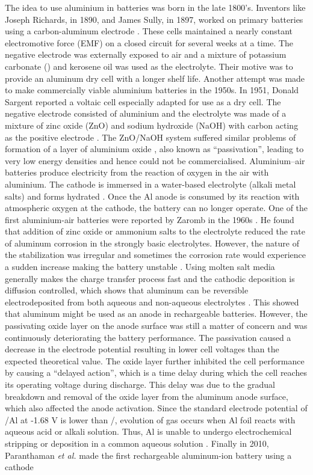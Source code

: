 The idea to use aluminium in batteries was born in the late 1800's. Inventors like Joseph Richards, in 1890, and James Sully, in 1897, worked on primary batteries using a carbon-aluminum electrode \cite{noauthor_james_1897, richards_aluminium_1890}. These cells maintained a nearly constant electromotive force (EMF) on a closed circuit for several weeks at a time. The negative electrode was externally exposed to air and a mixture of potassium carbonate () and kerosene oil was used as the electrolyte. Their motive was to provide an aluminum dry cell with a longer shelf life. Another attempt was made to make commercially viable aluminium batteries in the 1950s. In 1951, Donald Sargent reported a voltaic cell especially adapted for use as a dry cell. The negative electrode consisted of aluminium and the electrolyte was made of a mixture of zinc oxide (ZnO) and sodium hydroxide (NaOH) with carbon acting as the positive electrode \cite{sargent_voltaic_1951-2}. The ZnO/NaOH system suffered similar problems of formation of a layer of aluminium oxide , also known as \enquote{passivation}, leading to very low energy densities and hence could not be commercialised. Aluminium–air batteries produce electricity from the reaction of oxygen in the air with aluminium. The cathode is immersed in a water-based electrolyte (alkali metal salts) and forms hydrated . Once the Al anode is consumed by its reaction with atmospheric oxygen at the cathode, the battery can no longer operate. One of the first aluminium-air batteries were reported by Zaromb in the 1960s \cite{zaromb_use_1962}. He found that addition of zinc oxide or ammonium salts to the electrolyte reduced the rate of aluminum corrosion in the strongly basic electrolytes. However, the nature of the stabilization was irregular and sometimes the corrosion rate would experience a sudden increase making the battery unstable \cite{bockstie_control_1963}. Using molten salt media generally makes the charge transfer process fast and the cathodic deposition is diffusion controlled, which shows that aluminum can be reversible electrodeposited from both aqueous and non-aqueous electrolytes \cite{li_aluminum_2002}. This showed that aluminum might be used as an anode in rechargeable batteries. However, the passivating oxide layer on the anode surface was still a matter of concern and was continuously deteriorating the battery performance. The passivation caused a decrease in the electrode potential resulting in lower cell voltages than the expected theoretical value. The oxide layer further inhibited the cell performance by causing a \enquote{delayed action}, which is a time delay during which the cell reaches its operating voltage during discharge. This delay was due to the gradual breakdown and removal of the oxide layer from the aluminum anode surface, which also affected the anode activation. Since the standard electrode potential of /Al at -1.68 V is lower than /, evolution of  gas occurs when Al foil reacts with aqueous acid or alkali solution. Thus, Al is unable to undergo electrochemical stripping or deposition in a common aqueous solution \cite{wu_electrochemically_2019}. Finally in 2010, Paranthaman \textit{et al.} made the first rechargeable aluminum-ion battery using a cathode 